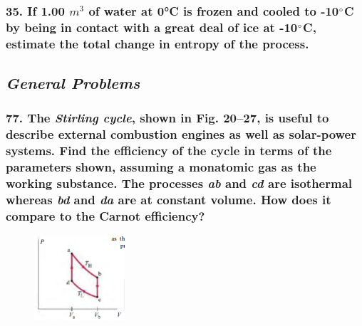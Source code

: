 \documentclass{article}
\begin{document}
\subsubsection*{
    35. If 1.00 $m^3$ of water at 0°C is frozen and cooled to -10$\degree$C 
    by being in contact with a great deal of ice at -10$\degree$C,
    estimate the total change in entropy of the process.
}
\newpage
\begin{center}
    \subsection*{\textbf{\textit{General Problems}}}
\end{center}
\subsubsection*{
    77. The \textit{Stirling cycle}, shown in Fig. 20–27, is useful to describe
    external combustion engines as well as solar-power systems.
    Find the efficiency of the cycle in terms of the parameters
    shown, assuming a monatomic gas as the working substance. The
    processes \textit{ab} and \textit{cd} are isothermal whereas \textit{bd} and \textit{da} are at constant
    volume. How does it compare to the Carnot efficiency?
}
\begin{figure}[h]
    \includegraphics[width=0.3\textwidth]{figures/20-27.png}
\end{figure}

\newpage
\end{document}
